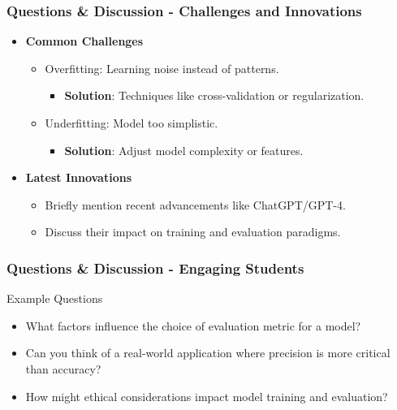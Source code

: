 \documentclass[aspectratio=169]{beamer}
\begin{document}
\begin{frame}[fragile]
    \frametitle{Questions \& Discussion - Challenges and Innovations}
    \begin{itemize}
        \item \textbf{Common Challenges}
            \begin{itemize}
                \item Overfitting: Learning noise instead of patterns.
                    \begin{itemize}
                        \item \textbf{Solution}: Techniques like cross-validation or regularization.
                    \end{itemize}
                \item Underfitting: Model too simplistic.
                    \begin{itemize}
                        \item \textbf{Solution}: Adjust model complexity or features.
                    \end{itemize}
            \end{itemize}

        \item \textbf{Latest Innovations}
            \begin{itemize}
                \item Briefly mention recent advancements like ChatGPT/GPT-4.
                \item Discuss their impact on training and evaluation paradigms.
            \end{itemize}
    \end{itemize}
\end{frame}

\begin{frame}[fragile]
    \frametitle{Questions \& Discussion - Engaging Students}
    \begin{block}{Example Questions}
        \begin{itemize}
            \item What factors influence the choice of evaluation metric for a model?
            \item Can you think of a real-world application where precision is more critical than accuracy?
            \item How might ethical considerations impact model training and evaluation?
        \end{itemize}
    \end{block}
\end{frame}
\end{document}
